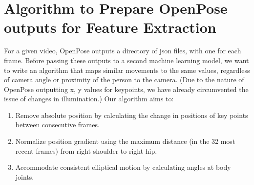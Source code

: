 \section{Algorithm to Prepare OpenPose outputs for Feature Extraction}
\label{sec:algorithm}

For a given video, OpenPose outputs a directory of json files, with one for each frame. Before passing these outputs to a second machine learning model, 
we want to write an algorithm that maps similar movements to the same values, regardless of camera angle or proximity of the person to the camera. 
(Due to the nature of OpenPose outputting x, y values for keypoints, we have already circumvented the issue of changes in illumination.)  Our algorithm aims to:
\\
\begin{enumerate}
    \item Remove absolute position by calculating the change in positions of key points between consecutive frames.
    \\
    \item Normalize position gradient using the maximum distance (in the 32 most recent frames) from right shoulder to right hip.
    \\
    \item Accommodate consistent elliptical motion by calculating angles at body joints.
\end{enumerate}

